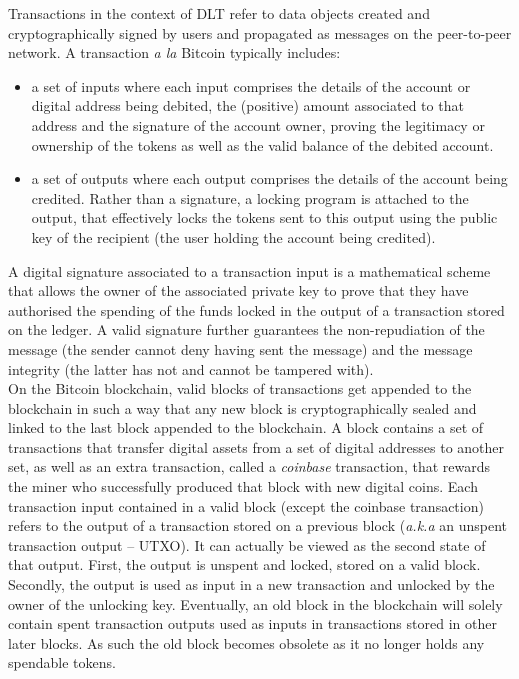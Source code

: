 Transactions in the context of DLT refer to data objects created and cryptographically signed by users and propagated as messages on the peer-to-peer network. A transaction \textit{a la} Bitcoin typically includes:

\begin{itemize}
\item a set of inputs where each input comprises the details of the account or digital address being debited, the (positive) amount associated to that address and the signature of the account owner, proving the legitimacy or ownership of the tokens as well as the valid balance of the debited account. 
\item a set of outputs where each output comprises the details of the account being credited. Rather than a signature, a locking program is attached to the output, that effectively locks the tokens sent to this output using the public key of the recipient (the user holding the account being credited).
\end{itemize}

A digital signature associated to a transaction input is a mathematical scheme that allows the owner of the associated private key to prove that they have authorised the spending of the funds locked in the output of a transaction stored on the ledger. A valid signature further guarantees the non-repudiation of the message (the sender cannot deny having sent the message) and the message integrity (the latter has not and cannot be tampered with). \\

On the Bitcoin blockchain, valid blocks of transactions get appended to the blockchain in such a way that any new block is cryptographically sealed and linked to the last block appended to the blockchain. A block contains a set of transactions that transfer digital assets from a set of digital addresses to another set, as well as an extra transaction, called a \textit{coinbase} transaction, that rewards the miner who successfully produced that block with new digital coins. Each transaction input contained in a valid block (except the coinbase transaction) refers to the output of a transaction stored on a previous block (\textit{a.k.a} an unspent transaction output – UTXO). It can actually be viewed as the second state of that output. First, the output is unspent and locked, stored on a valid block. Secondly, the output is used as input in a new transaction and unlocked by the owner of the unlocking key. Eventually, an old block in the blockchain will solely contain spent transaction outputs used as inputs in transactions stored in other later blocks. As such the old block becomes obsolete as it no longer holds any spendable tokens. \\

